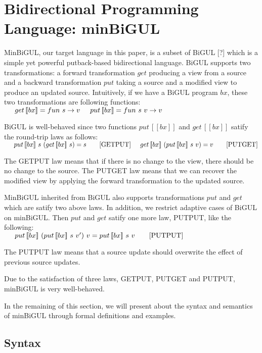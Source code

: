 \documentclass[runningheads]{llncs}
\newcommand{\tab}{\hspace*{5mm}}
\newcommand{\putbx}[3]{put \, [\![#1]\!] \ #2 \ #3}
\newcommand{\putbxinline}[1]{put \, [\![#1]\!]}
\newcommand{\getbx}[2]{get \, [\![#1]\!] \ #2}
\newcommand{\getbxinline}[1]{get \, [\![#1]\!]}
\begin{document}
\section{Bidirectional Programming Language: minBiGUL}

MinBiGUL, our target language in this paper, is a subset of BiGUL [?] which is a simple yet powerful putback-based bidirectional language. BiGUL supports two transformations: a forward transformation $get$ producing a view from a source and a backward transformation $put$ taking a source and a modified view to produce an updated source. Intuitively, if we have a BiGUL program $bx$, these two transformations are following functions:\\
    $\tab \getbxinline{bx} = fun \ s \to v \\
    \tab \putbxinline{bx} = fun \ s \ v \to v$

BiGUL is well-behaved since two functions $\putbxinline{bx}$ and $\getbxinline{bx}$ satify the round-trip laws as follows:\\
    $\tab \putbx{bx}{s}{(\getbx{bx}{s})} = s \qquad [\text{GETPUT}]\\
    \tab \getbx{bx}{(\putbx{bx}{s}{v})} = v \qquad [\text{PUTGET}]$

The GETPUT law means that if there is no change to the view, there should be no change to the source. The PUTGET law means that we can recover the modified view by applying the forward transformation to the updated source.

MinBiGUL inherited from BiGUL also supports transformations $put$ and $get$ which are satify two above laws. In addition, we restrict adaptive cases of BiGUL on minBiGUL. Then $put$ and $get$ satify one more law, PUTPUT, like the following:\\
    $\tab \putbx{bx}{(\putbx{bx}{s}{v'})}{v} = \putbx{bx}{s}{v} \qquad [\text{PUTPUT}]$

The PUTPUT law means that a source update should overwrite the effect of previous source updates.

Due to the satisfaction of three laws, GETPUT, PUTGET and PUTPUT, minBiGUL is very well-behaved.

In the remaining of this section, we will present about the syntax and semantics of minBiGUL through formal definitions and examples.

\subsection{Syntax}
\end{document}

